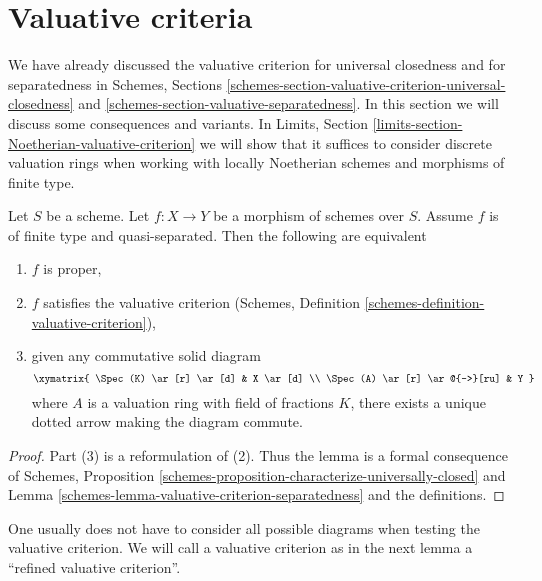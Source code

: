 \section{Valuative criteria}
\label{section-valuative-criteria}

\noindent
We have already discussed the valuative criterion for universal closedness
and for separatedness in Schemes, Sections
\ref{schemes-section-valuative-criterion-universal-closedness} and
\ref{schemes-section-valuative-separatedness}.
In this section we will discuss some consequences and variants.
In Limits, Section \ref{limits-section-Noetherian-valuative-criterion}
we will show that it suffices to consider discrete valuation
rings when working with locally Noetherian schemes and
morphisms of finite type.

\begin{lemma}
\label{lemma-characterize-proper}
\begin{reference}
\cite[II Theorem 7.3.8]{EGA}
\end{reference}
Let $S$ be a scheme. Let $f : X \to Y$ be a morphism of schemes
over $S$. Assume $f$ is of finite type and quasi-separated.
Then the following are equivalent
\begin{enumerate}
\item $f$ is proper,
\item $f$ satisfies the valuative criterion
(Schemes, Definition \ref{schemes-definition-valuative-criterion}),
\item given any commutative solid diagram
$$
\xymatrix{
\Spec(K) \ar[r] \ar[d] & X \ar[d] \\
\Spec(A) \ar[r] \ar@{-->}[ru] & Y
}
$$
where $A$ is a valuation ring with field of fractions $K$, there exists
a unique dotted arrow making the diagram commute.
\end{enumerate}
\end{lemma}

\begin{proof}
Part (3) is a reformulation of (2). Thus the lemma is a formal
consequence of
Schemes, Proposition \ref{schemes-proposition-characterize-universally-closed}
and Lemma \ref{schemes-lemma-valuative-criterion-separatedness}
and the definitions.
\end{proof}

\noindent
One usually does not have to consider all possible diagrams
when testing the valuative criterion. We will call a valuative
criterion as in the next lemma a ``refined valuative criterion''.

